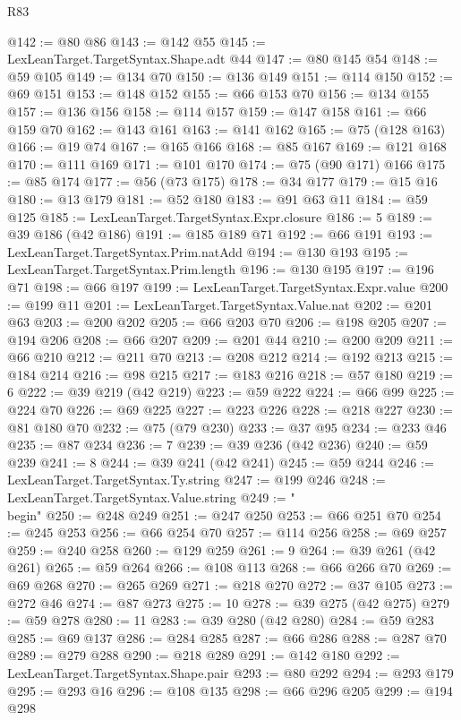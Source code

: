 \begin{lexlean}{R83}
\begin{coremodule}
@142 := @80 @86
@143 := @142 @55
@145 := LexLeanTarget.TargetSyntax.Shape.adt @44
@147 := @80 @145 @54
@148 := @59 @105
@149 := @134 @70
@150 := @136 @149
@151 := @114 @150
@152 := @69 @151
@153 := @148 @152
@155 := @66 @153 @70
@156 := @134 @155
@157 := @136 @156
@158 := @114 @157
@159 := @147 @158
@161 := @66 @159 @70
@162 := @143 @161
@163 := @141 @162
@165 := @75 (@128 @163)
@166 := @19 @74
@167 := @165 @166
@168 := @85 @167
@169 := @121 @168
@170 := @111 @169
@171 := @101 @170
@174 := @75 (@90 @171) @166
@175 := @85 @174
@177 := @56 (@73 @175)
@178 := @34 @177
@179 := @15 @16
@180 := @13 @179
@181 := @52 @180
@183 := @91 @63 @11
@184 := @59 @125
@185 := LexLeanTarget.TargetSyntax.Expr.closure
@186 := 5
@189 := @39 @186 (@42 @186)
@191 := @185 @189 @71
@192 := @66 @191
@193 := LexLeanTarget.TargetSyntax.Prim.natAdd
@194 := @130 @193
@195 := LexLeanTarget.TargetSyntax.Prim.length
@196 := @130 @195
@197 := @196 @71
@198 := @66 @197
@199 := LexLeanTarget.TargetSyntax.Expr.value
@200 := @199 @11
@201 := LexLeanTarget.TargetSyntax.Value.nat
@202 := @201 @63
@203 := @200 @202
@205 := @66 @203 @70
@206 := @198 @205
@207 := @194 @206
@208 := @66 @207
@209 := @201 @44
@210 := @200 @209
@211 := @66 @210
@212 := @211 @70
@213 := @208 @212
@214 := @192 @213
@215 := @184 @214
@216 := @98 @215
@217 := @183 @216
@218 := @57 @180
@219 := 6
@222 := @39 @219 (@42 @219)
@223 := @59 @222
@224 := @66 @99
@225 := @224 @70
@226 := @69 @225
@227 := @223 @226
@228 := @218 @227
@230 := @81 @180 @70
@232 := @75 (@79 @230)
@233 := @37 @95
@234 := @233 @46
@235 := @87 @234
@236 := 7
@239 := @39 @236 (@42 @236)
@240 := @59 @239
@241 := 8
@244 := @39 @241 (@42 @241)
@245 := @59 @244
@246 := LexLeanTarget.TargetSyntax.Ty.string
@247 := @199 @246
@248 := LexLeanTarget.TargetSyntax.Value.string
@249 := "\\begin"
@250 := @248 @249
@251 := @247 @250
@253 := @66 @251 @70
@254 := @245 @253
@256 := @66 @254 @70
@257 := @114 @256
@258 := @69 @257
@259 := @240 @258
@260 := @129 @259
@261 := 9
@264 := @39 @261 (@42 @261)
@265 := @59 @264
@266 := @108 @113
@268 := @66 @266 @70
@269 := @69 @268
@270 := @265 @269
@271 := @218 @270
@272 := @37 @105
@273 := @272 @46
@274 := @87 @273
@275 := 10
@278 := @39 @275 (@42 @275)
@279 := @59 @278
@280 := 11
@283 := @39 @280 (@42 @280)
@284 := @59 @283
@285 := @69 @137
@286 := @284 @285
@287 := @66 @286
@288 := @287 @70
@289 := @279 @288
@290 := @218 @289
@291 := @142 @180
@292 := LexLeanTarget.TargetSyntax.Shape.pair
@293 := @80 @292
@294 := @293 @179
@295 := @293 @16
@296 := @108 @135
@298 := @66 @296 @205
@299 := @194 @298

\end{coremodule}
\end{lexlean}
